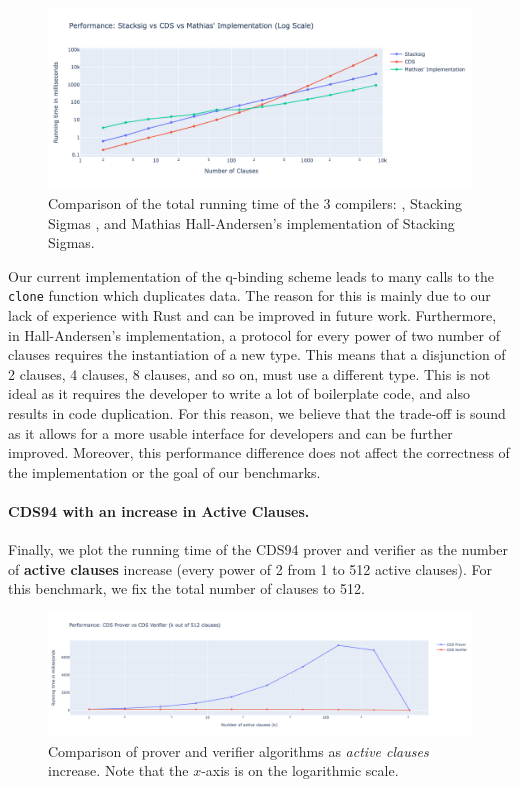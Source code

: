 \begin{figure}[H]
  \centering
  \includegraphics[width=0.9\linewidth]{../assets/plots/3log.png}
  \caption{Comparison of the total running time of the 3 compilers: \cite{CDS94}, 
  Stacking Sigmas \cite{StackingSigmas}, and
  Mathias Hall-Andersen's implementation \cite{MHAStackSig} of Stacking Sigmas.}
  \label{fig:3log}
\end{figure}

 

Our current implementation of the q-binding scheme leads to many calls to the 
\texttt{clone} function which duplicates data. The reason for this is mainly due 
to our lack of experience with Rust and can be improved in future work. Furthermore, 
in Hall-Andersen's implementation, a protocol for every power of two number of 
clauses requires the instantiation of a new type. This means that 
a disjunction of 2 clauses, 4 clauses, 8 clauses, and so on, must use a different 
type. This is not ideal as it requires the developer to write a lot of boilerplate
code, and also results in code duplication. For this reason,
we believe that the trade-off is sound as it allows for a more usable interface for 
developers and can be further improved. Moreover, this performance difference does 
not affect the correctness of the implementation or the goal of our benchmarks. 


\paragraph{CDS94 with an increase in Active Clauses.} Finally, we plot the running time of the CDS94 prover and verifier as the number of
\textbf{active clauses} increase (every power of 2 from 1 to 512 active clauses). 
For this benchmark, we fix the total number of clauses to 512.

\begin{figure}[H]
  \centering
  \includegraphics[width=\linewidth]{../assets/plots/cds_threshold.png}
  \caption{Comparison of prover and verifier algorithms as \textit{active clauses} increase. Note that the $x$-axis is on the logarithmic scale.}
  \label{fig:cds_threshold}
\end{figure}

